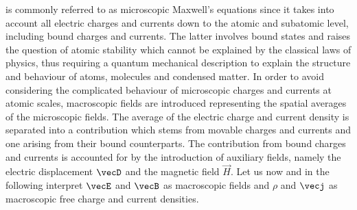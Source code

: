 \documentclass[
twoside,
openright,
titlepage,
numbers=noenddot,
headinclude,
fleqn,
a4paper,
footinclude=true,
cleardoublepage=empty,
abstractoff,
BCOR=5mm,
paper=a4,
fontsize=11pt,
british,ngerman,american,
]{scrreprt}
\begin{document}
 is commonly referred to as
microscopic Maxwell's equations since it takes into account all
electric charges and currents down to the atomic and subatomic level,
\ie{} including bound charges and currents.  The latter involves bound
states and raises the question of atomic stability which cannot be
explained by the classical laws of physics, thus requiring a quantum
mechanical description to explain the structure and behaviour of
atoms, molecules and condensed matter.  In order to avoid considering
the complicated behaviour of microscopic charges and currents at
atomic scales, macroscopic fields are introduced representing the
spatial averages of the microscopic fields.  The average of the
electric charge and current density is separated into a contribution
which stems from movable charges and currents and one arising from
their bound counterparts.  The contribution from bound charges and
currents is accounted for by the introduction of auxiliary fields,
namely the electric displacement $\vecD$ and the magnetic field
$\vec{H}$.  Let us now and in the following interpret $\vecE$ and
$\vecB$ as macroscopic fields and $\rho$ and $\vecj$ as macroscopic
free charge and current densities.
\end{document}
